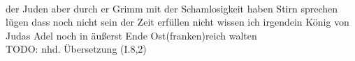 \begin{exe}
\ex \label{ex:I4768} \gll {}                                    \\
{der} {Juden} {aber} {durch} {er} {Grimm} {mit} {der} {Schamlosigkeit} {haben} {Stirn} {sprechen} {lügen} {dass} {noch} {nicht} {sein} {der} {Zeit} {erfüllen} {} {nicht} {wissen} {ich} {irgendein} {König} {von} {Judas} {Adel} {noch} {in} {äußerst} {Ende} {Ost(franken)reich} {walten} {}\\
\glt TODO: nhd. Übersetzung (I.8,2)
\end{exe}
